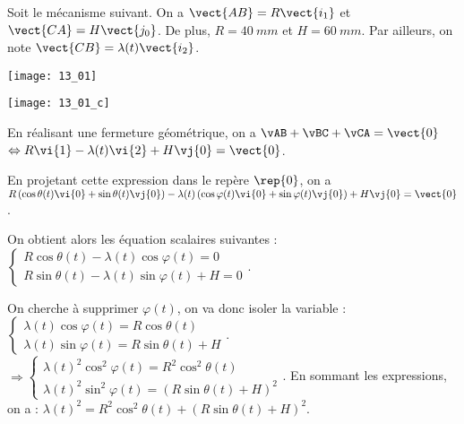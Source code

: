 \normaltrue \difficilefalse \tdifficilefalse
\correctiontrue


\setcounter{question}{0}

\ifcorrection
\else
{}
\fi

\ifprof
\else

Soit le mécanisme suivant. On a $\vect{AB}=R\vect{i_1}$ et $\vect{CA}=H\vect{j_0}$. De plus, 
$R=\SI{40}{mm}$ et $H=\SI{60}{mm}$. Par ailleurs, on note $\vect{CB}=\lambda(t) \vect{i_2}$.


\begin{center}
\texttt{[image: 13\_01]}
\end{center}
\fi



\ifprof

\begin{center}
\texttt{[image: 13\_01\_c]}
\end{center}

\else
\fi


\ifprof

En réalisant une fermeture géométrique, on a $\vAB + \vBC + \vCA = \vect{0}$ 
$\Leftrightarrow R\vi{1} - \lambda(t)\vi{2} + H \vj{0}= \vect{0}$. 

En projetant cette expression dans le repère 
$\rep{0}$, on a 
$ R\left(\cos\theta(t) \vi{0}+\sin\theta(t) \vj{0} \right) - \lambda(t)\left(\cos\varphi(t) \vi{0}+\sin\varphi(t) \vj{0} \right) + H \vj{0} = \vect{0}$.

On obtient alors les équation scalaires suivantes : 
$\left\{
\begin{array}{l}
R\cos\theta(t) - \lambda(t)\cos\varphi(t)  = {0} \\
R\sin\theta(t)  - \lambda(t)\sin\varphi(t) + H  = {0} 
\end{array}
\right.
$.

On cherche à supprimer $\varphi(t)$, on va donc isoler la variable :
$\left\{
\begin{array}{l}
\lambda(t)\cos\varphi(t) = R\cos\theta(t)   \\
\lambda(t)\sin\varphi(t)  = R\sin\theta(t)  +H  
\end{array}
\right.
$.
$
\Rightarrow
\left\{
\begin{array}{l}
\lambda(t)^2\cos^2\varphi(t) = R^2\cos^2\theta(t)   \\
\lambda(t)^2\sin^2\varphi(t)  = \left(R\sin\theta(t)  +H \right)^2
\end{array}
\right.
$.
En sommant les expressions, on a : 
$\lambda(t)^2 =  R^2\cos^2\theta(t)  + \left(R\sin\theta(t)  +H \right)^2$.

